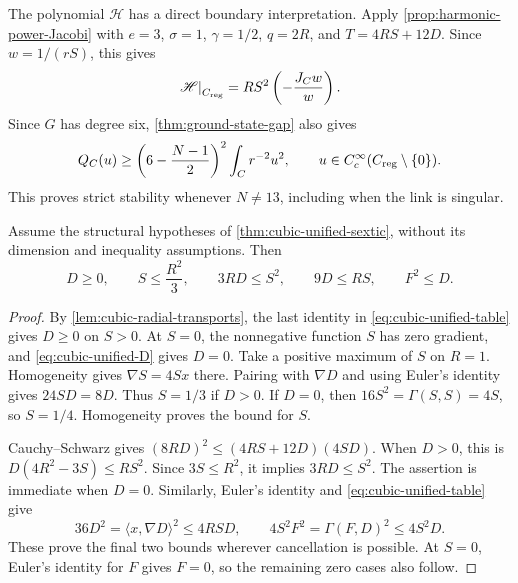 The polynomial \(\mathscr H\) has a direct boundary interpretation.
Apply \cref{prop:harmonic-power-Jacobi} with \(e=3\),
\(\sigma=1\), \(\gamma=1/2\), \(q=2R\), and
\(T=4RS+12D\). Since \(w=1/(rS)\), this gives
\begin{equation}\label{eq:cubic-H-Jacobi-meaning}
 \left.\mathscr H\right|_{C_{\mathrm{reg}}}
 =RS^2\left(-\frac{J_Cw}{w}\right).
\end{equation}
Since \(G\) has degree six, \cref{thm:ground-state-gap} also gives
\[
 Q_C(u)\geq\left(6-\frac{N-1}{2}\right)^2\int_Cr^{-2}u^2,
 \qquad u\in C_c^\infty(C_{\mathrm{reg}}\setminus\{0\}).
\]
This proves strict stability whenever \(N\ne13\), including when
the link is singular.

\begin{lemma}
\label{lem:cubic-unified-bounds}
Assume the structural hypotheses of \cref{thm:cubic-unified-sextic},
without its dimension and inequality assumptions. Then
\begin{equation}\label{eq:cubic-unified-bounds}
 D\ge0,\qquad S\le\frac{R^2}{3},\qquad
 3RD\le S^2,\qquad 9D\le RS,\qquad F^2\le D.
\end{equation}
\end{lemma}

\begin{proof}
By \cref{lem:cubic-radial-transports}, the last identity in
\eqref{eq:cubic-unified-table} gives \(D\ge0\) on \(S>0\).
At \(S=0\), the nonnegative function \(S\) has zero gradient, and \eqref{eq:cubic-unified-D} gives \(D=0\).
Take a positive maximum of \(S\) on \(R=1\). Homogeneity gives
\(\nabla S=4Sx\) there. Pairing with \(\nabla D\) and using
Euler's identity gives \(24SD=8D\). Thus \(S=1/3\) if \(D>0\).
If \(D=0\), then \(16S^2=\Gamma(S,S)=4S\), so \(S=1/4\).
Homogeneity proves the bound for \(S\).

Cauchy--Schwarz gives \((8RD)^2\le(4RS+12D)(4SD)\).
When \(D>0\), this is
\(D(4R^2-3S)\le RS^2\). Since \(3S\le R^2\), it implies
\(3RD\le S^2\). The assertion is immediate when \(D=0\).
Similarly, Euler's identity and \eqref{eq:cubic-unified-table} give
\[
 36D^2=\langle x,\nabla D\rangle^2\le4RSD,
 \qquad
 4S^2F^2=\Gamma(F,D)^2\le4S^2D.
\]
These prove the final two bounds wherever cancellation is possible.
At \(S=0\), Euler's identity for \(F\) gives \(F=0\), so the
remaining zero cases also follow.
\end{proof}

